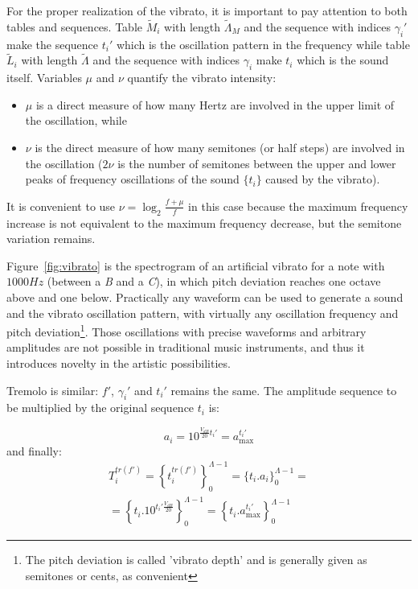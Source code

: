 For the proper realization of the vibrato, it is important to pay attention to both tables and sequences. Table $\widetilde{M}_i$ with length $\widetilde{\Lambda}_M$ and the sequence with indices $\gamma_i'$ make the sequence $t_i'$ which is the oscillation pattern in the frequency while table $\widetilde{L}_i$ with length $\widetilde{\Lambda}$ and the sequence with indices $\gamma_i$ make $t_i$ which is the sound itself. Variables $\mu$ and $\nu$ quantify the vibrato intensity:
\begin{itemize}
    \item $\mu$ is a direct measure of how many Hertz are involved in the upper limit of the oscillation, while
    \item $\nu$ is the direct measure of how many semitones (or half steps) are involved in the oscillation ($2\nu$ is the number of semitones between the upper and lower peaks of frequency oscillations of the sound $\{t_i\}$ caused by the vibrato).
\end{itemize}

It is convenient to use $\nu=\log_{2}\frac{f+\mu}{f} $ in this case because the maximum frequency increase is not equivalent to the maximum frequency decrease, but the semitone variation remains.

Figure~\ref{fig:vibrato} is the spectrogram of an artificial vibrato for a note with $1000Hz$ (between a \emph{B} and a \emph{C}), in which pitch deviation reaches one octave above and one below. Practically any waveform can be used to generate a sound and the vibrato oscillation pattern, with virtually any oscillation frequency and pitch deviation\footnote{The pitch deviation is called 'vibrato depth' and is generally given as semitones or cents, as convenient}.
Those oscillations with precise waveforms and arbitrary amplitudes are not possible in traditional music instruments, and thus it introduces novelty in the artistic possibilities.

Tremolo is similar: $f'$, $\gamma_i'$ and $t_i'$ remains the same.
The amplitude sequence to be multiplied by the original sequence $t_i$ is:

\begin{equation}\label{trA}
 a_i=10^{\frac{V_{dB}}{20}t_i' } = a_{\text{max}}^{t_i'}
\end{equation}
and finally: 
\begin{multline}\label{trT}
 T_i^{tr(f')}=\left \{ t_i^{tr(f')} \right \}_0^{\Lambda-1}=\{ t_i . a_i \}_0^{\Lambda-1}= \\ =\left \{t_i .10^{t_i' \frac{V_{dB}}{20}}    \right \}_0^{\Lambda-1}=\left\{t_i . a_{\text{max}}^{t_i'} \right\}_0^{\Lambda-1}
\end{multline}

